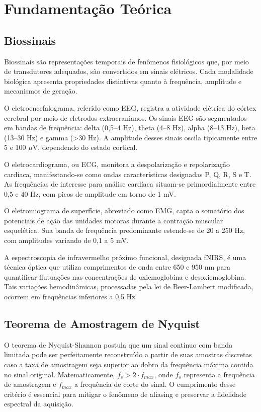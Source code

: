 \chapter{Fundamentação Teórica}
\label{cap:fundamentacao-teorica}

\section{Biossinais}

Biossinais são representações temporais de fenômenos fisiológicos que, por meio de transdutores adequados, são convertidos em sinais elétricos. Cada modalidade biológica apresenta propriedades distintivas quanto à frequência, amplitude e mecanismos de geração.

O eletroencefalograma, referido como EEG, registra a atividade elétrica do córtex cerebral por meio de eletrodos extracranianos. Os sinais EEG são segmentados em bandas de frequência: delta (0,5--4 Hz), theta (4--8 Hz), alpha (8--13 Hz), beta (13--30 Hz) e gamma (>30 Hz). A amplitude desses sinais oscila tipicamente entre 5 e 100 $\mu$V, dependendo do estado cortical.

O eletrocardiograma, ou ECG, monitora a despolarização e repolarização cardíaca, manifestando-se como ondas características designadas P, Q, R, S e T. As frequências de interesse para análise cardíaca situam-se primordialmente entre 0,5 e 40 Hz, com picos de amplitude em torno de 1 mV.

O eletromiograma de superfície, abreviado como EMG, capta o somatório dos potenciais de ação das unidades motoras durante a contração muscular esquelética. Sua banda de frequência predominante estende-se de 20 a 250 Hz, com amplitudes variando de 0,1 a 5 mV.

A espectroscopia de infravermelho próximo funcional, designada fNIRS, é uma técnica óptica que utiliza comprimentos de onda entre 650 e 950 nm para quantificar flutuações nas concentrações de oxiemoglobina e desoxiemoglobina. Tais variações hemodinâmicas, processadas pela lei de Beer-Lambert modificada, ocorrem em frequências inferiores a 0,5 Hz.

\section{Teorema de Amostragem de Nyquist}

O teorema de Nyquist-Shannon postula que um sinal contínuo com banda limitada pode ser perfeitamente reconstruído a partir de suas amostras discretas caso a taxa de amostragem seja superior ao dobro da frequência máxima contida no sinal original. Matematicamente, $f_s > 2 \cdot f_{max}$, onde $f_s$ representa a frequência de amostragem e $f_{max}$ a frequência de corte do sinal. O cumprimento desse critério é essencial para mitigar o fenômeno de aliasing e preservar a fidelidade espectral da aquisição.

